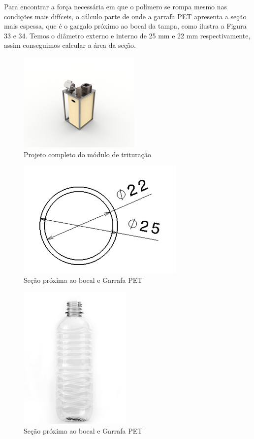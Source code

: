 Para encontrar a força necessária em que o polímero se rompa mesmo nas condições mais difíceis, o cálculo parte de onde a garrafa PET apresenta a seção mais espessa, que é o gargalo próximo ao bocal da tampa, como ilustra a Figura 33 e 34. Temos o diâmetro externo e interno de 25 mm e 22 mm respectivamente, assim conseguimos calcular a área da seção.

\begin{figure}[!h]
	\centering
		\includegraphics[scale=1.2]{figuras/estrutura/20(2).png}
	\caption{Projeto completo do módulo de trituração}
\end{figure}

\begin{figure}[!h]
	\centering
		\includegraphics[scale=0.7]{figuras/estrutura/21(1).png}
	\caption{Seção próxima ao bocal e Garrafa PET}
\end{figure}

\begin{figure}[!h]
	\centering
		\includegraphics[scale=0.6]{figuras/estrutura/21(2).png}
	\caption{Seção próxima ao bocal e Garrafa PET}
\end{figure}

